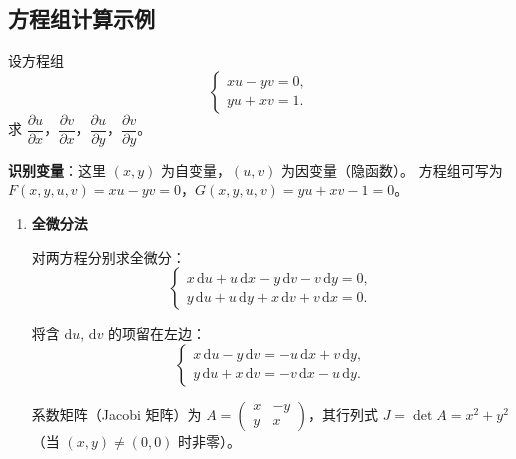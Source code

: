 \documentclass[lang=cn,11pt]{elegantbook}
\begin{document}
\subsection{方程组计算示例}

\begin{exercise}[线性方程组的隐函数] \label{ex:implicit-system1}
设方程组
\[
\begin{cases}
xu-yv=0,\\
yu+xv=1.
\end{cases}
\]
求 $\dfrac{\partial u}{\partial x}$，$\dfrac{\partial v}{\partial x}$，$\dfrac{\partial u}{\partial y}$，$\dfrac{\partial v}{\partial y}$。
\end{exercise}

\begin{solution}
\textbf{识别变量}：这里 $(x,y)$ 为自变量，$(u,v)$ 为因变量（隐函数）。
方程组可写为 $F(x,y,u,v)=xu-yv=0$，$G(x,y,u,v)=yu+xv-1=0$。

\begin{enumerate}
  \item[\textbf{方法一：}] \textbf{全微分法}
  
  对两方程分别求全微分：
  \[
  \begin{cases}
  x\,\mathrm{d}u+u\,\mathrm{d}x-y\,\mathrm{d}v-v\,\mathrm{d}y=0,\\[6pt]
  y\,\mathrm{d}u+u\,\mathrm{d}y+x\,\mathrm{d}v+v\,\mathrm{d}x=0.
  \end{cases}
  \]
  
  将含 $\mathrm{d}u$, $\mathrm{d}v$ 的项留在左边：
  \[
  \begin{cases}
  x\,\mathrm{d}u-y\,\mathrm{d}v=-u\,\mathrm{d}x+v\,\mathrm{d}y,\\[6pt]
  y\,\mathrm{d}u+x\,\mathrm{d}v=-v\,\mathrm{d}x-u\,\mathrm{d}y.
  \end{cases}
  \]
  
  系数矩阵（Jacobi 矩阵）为 $A=\begin{pmatrix} x & -y \\ y & x \end{pmatrix}$，其行列式 $J=\det A=x^2+y^2$（当 $(x,y) \neq (0,0)$ 时非零）。
  

\end{enumerate}
\end{solution}
\end{document}
